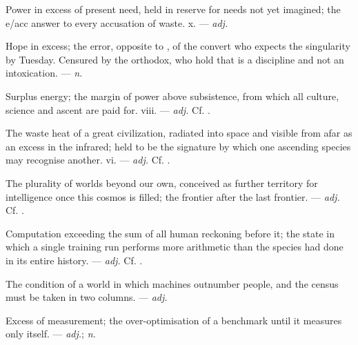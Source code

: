  Power in excess of present need, held in reserve for needs not yet imagined; the e/acc answer to every accusation of waste.   x. ---  \textit{adj.}

 Hope in excess; the error, opposite to , of the convert who expects the singularity by Tuesday. Censured by the orthodox, who hold that  is a discipline and not an intoxication. ---  \textit{n.}

 Surplus energy; the margin of power above subsistence, from which all culture, science and ascent are paid for.   viii. ---  \textit{adj.} Cf. .

 The waste heat of a great civilization, radiated into space and visible from afar as an excess in the infrared; held to be the signature by which one ascending species may recognise another.   vi. ---  \textit{adj.} Cf. .

 The plurality of worlds beyond our own, conceived as further territory for intelligence once this cosmos is filled; the frontier after the last frontier. ---  \textit{adj.} Cf. .

 Computation exceeding the sum of all human reckoning before it; the state in which a single training run performs more arithmetic than the species had done in its entire history. ---  \textit{adj.} Cf. .

 The condition of a world in which machines outnumber people, and the census must be taken in two columns.   ---  \textit{adj.}

 Excess of measurement; the over-optimisation of a benchmark until it measures only itself.  ---  \textit{adj.};  \textit{n.}

